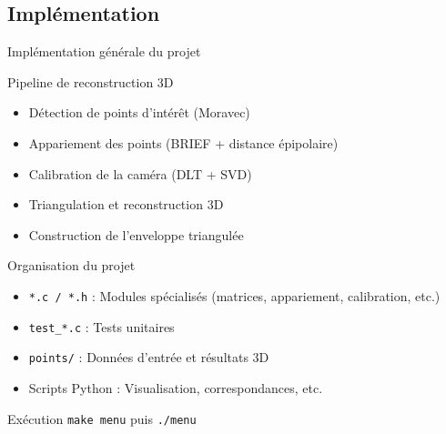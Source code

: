 
\subsection{Implémentation}

\begin{frame}{Implémentation générale du projet}
\vspace{-0.5em}
\begin{block}{Pipeline de reconstruction 3D}
\begin{itemize}
  \item Détection de points d’intérêt (Moravec)
  \pause
  \item Appariement des points (BRIEF + distance épipolaire)
  \pause
  \item Calibration de la caméra (DLT + SVD)
  \pause
  \item Triangulation et reconstruction 3D
  \pause
  \item Construction de l’enveloppe triangulée
\end{itemize}
\end{block}

\vspace{-0.5em}
\pause
\begin{block}{Organisation du projet}
\begin{itemize}
  \item \texttt{*.c / *.h} : Modules spécialisés (matrices, appariement, calibration, etc.)
  \pause
  \item \texttt{test\_*.c} : Tests unitaires
  \pause
  \item \texttt{points/} : Données d’entrée et résultats 3D
  \pause
  \item Scripts Python : Visualisation, correspondances, etc.
\end{itemize}
\end{block}

\vspace{-0.5em}
\pause
\begin{block}{Exécution}
\texttt{make menu} puis \texttt{./menu}
\end{block}
\end{frame}

